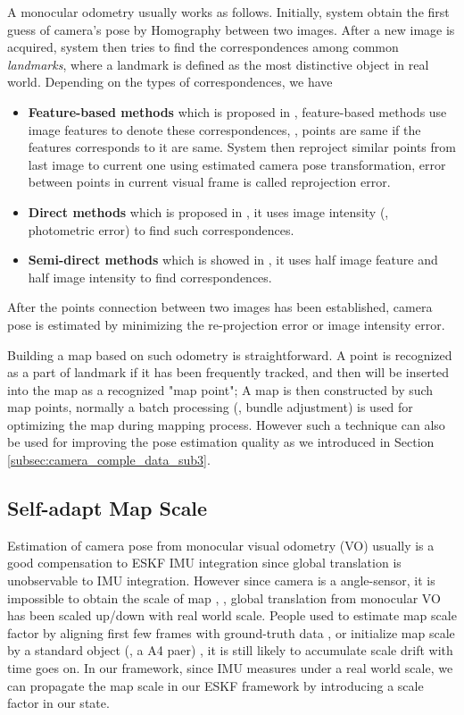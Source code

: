 A monocular odometry usually works as follows. Initially, system obtain the first guess of camera's pose by Homography \cite{fischler1981random} between two images. After a new image is acquired, system then tries to find the correspondences among common \textit{landmarks}, where a landmark is defined as the most distinctive object in real world. Depending on the types of correspondences, we have
\begin{itemize}
\item {\textbf{Feature-based methods} which is proposed in \cite{davison2007monoslam, eade2007monocular, klein2007parallel, mur2015orb}, feature-based methods use image features to denote these correspondences, \eg, points are same if the features corresponds to it are same. System then reproject similar points from last image to current one using estimated camera pose transformation, error between points in current visual frame is called reprojection error.}
\item {\textbf{Direct methods} which is proposed in \cite{engel2014lsd}, it uses image intensity (\eg, photometric error) to find such correspondences.}
\item {\textbf{Semi-direct methods} which is showed in \cite{forster2014svo}, it uses half image feature and half image intensity to find correspondences.}
\end{itemize}
After the points connection between two images has been established, camera pose is estimated by minimizing the re-projection error or image intensity error.

Building a map based on such odometry is straightforward. A point is recognized as a part of landmark if it has been frequently tracked, and then will be inserted into the map as a recognized "map point"; A map is then constructed by such map points, normally a batch processing (\eg, bundle adjustment) is used for optimizing the map during mapping process. However such a technique can also be used for improving the pose estimation quality as we introduced in Section \ref{subsec:camera_comple_data_sub3}.

\subsection{Self-adapt Map Scale}
\label{subsec:camera_comple_data_sub2}

Estimation of camera pose from monocular visual odometry (VO) usually is a good compensation to ESKF IMU integration since global translation is unobservable to IMU integration. However since camera is a angle-sensor, it is impossible to obtain the scale of map \cite{forster2014svo}, \ie, global translation from monocular VO has been scaled up/down with real world scale. People used to estimate map scale factor by aligning first few frames with ground-truth data \cite{forster2014svo}, or initialize map scale by a standard object (\eg, a A4 paer) \cite{davison2007monoslam}, it is still likely to accumulate scale drift with time goes on. In our framework, since IMU measures under a real world scale, we can propagate the map scale in our ESKF framework by introducing a scale factor in our state. 

